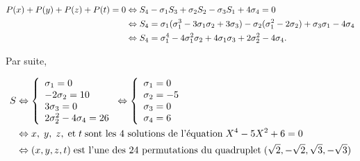 {{\begin{align*}\ensuremath
P(x)+P(y)+P(z)+P(t)=0&\Leftrightarrow S_4-\sigma_1S_3+\sigma_2S_2-\sigma_3S_1+4\sigma_4=0\\
 &\Leftrightarrow S_4=\sigma_1(\sigma_1^3-3\sigma_1\sigma_2+3\sigma_3)-\sigma_2(\sigma_1^2-2\sigma_2)+\sigma_3\sigma_1-4\sigma_4\\
 &\Leftrightarrow S_4=\sigma_1^4-4\sigma_1^2\sigma_2+4\sigma_1\sigma_3+2\sigma_2^2-4\sigma_4.
\end{align*}

Par suite,

\begin{align*}\ensuremath
S&\Leftrightarrow
\left\{
\begin{array}{l}
\sigma_1=0\\
-2\sigma_2=10\\
3\sigma_3=0\\
2\sigma_2^2-4\sigma_4=26
\end{array}
\right.\Leftrightarrow\left\{
\begin{array}{l}
\sigma_1=0\\
\sigma_2=-5\\
\sigma_3=0\\
\sigma_4=6
\end{array}
\right.\\
 &\Leftrightarrow x,\;y,\;z,\;\mbox{et}\;t\;\mbox{sont les 4 solutions de l'équation}\;X^4-5X^2+6=0\\
 &\Leftrightarrow(x,y,z,t)\;\mbox{est l'une des 24 permutations du quadruplet}\;(\sqrt{2},-\sqrt{2},\sqrt{3},-\sqrt{3})
\end{align*}
}
}
